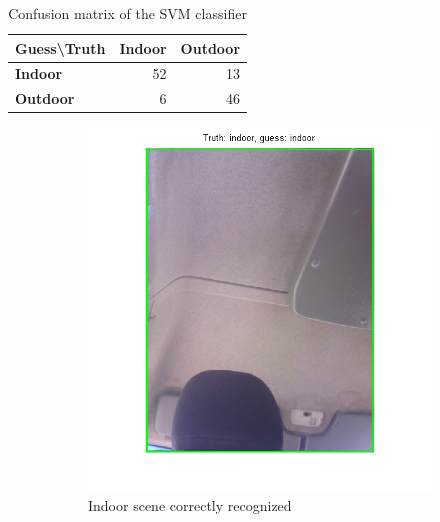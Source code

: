 \begin{table}[htb]
\centering
\begin{tabular}{l|rr}
\textbf{Guess{\textbackslash}Truth} & \textbf{Indoor} & \textbf{Outdoor} \\ \hline
\textbf{Indoor} & 52 & 13 \\
\textbf{Outdoor} & 6 & 46 \\
\end{tabular}
\caption{Confusion matrix of the SVM classifier}
\label{tab:confusion-matrix}
\end{table}

\begin{figure}[htb]
	\centering
	\begin{subfigure}[t]{0.4\textwidth}
		\includegraphics[width=\textwidth]{./img/ex2/indoor-nailed.png}
		\caption{Indoor scene correctly recognized}
		\label{fig:indoor-nailed}
	\end{subfigure}
	~
	\begin{subfigure}[t]{0.4\textwidth}

\end{subfigure}
\end{figure}

